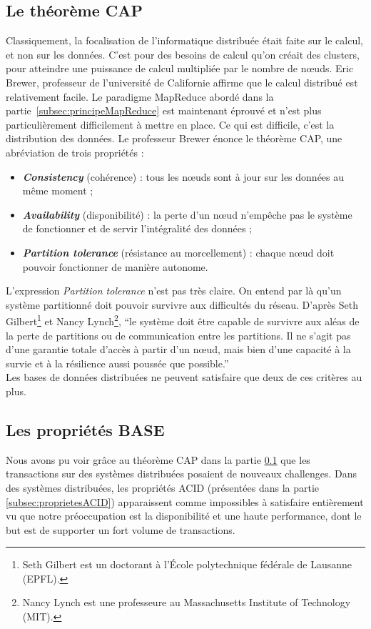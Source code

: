 \subsection{Le théorème CAP}
\label{subsec:theoremeCAP}
	Classiquement, la focalisation de l'informatique distribuée était faite sur le calcul, et non sur les données. C'est pour des besoins de calcul qu'on créait des clusters, pour atteindre une puissance de calcul multipliée par le nombre de nœuds. Eric Brewer, professeur de l'université de Californie affirme que le calcul distribué est relativement facile. Le paradigme MapReduce abordé dans la partie~\ref{subsec:principeMapReduce} est maintenant éprouvé et n'est plus particulièrement difficilement à mettre en place. Ce qui est difficile, c'est la distribution des données. Le professeur Brewer énonce le théorème CAP, une abréviation de trois propriétés :
	\vspace{10px}
	\begin{itemize}
		\item \textbf{\textit{Consistency}} (cohérence) : tous les nœuds sont à jour sur les données au même moment ; 
		\item \textbf{\textit{Availability}} (disponibilité) : la perte d'un nœud n'empêche pas le système de fonctionner et de servir l'intégralité des données ; 
		\item \textbf{\textit{Partition tolerance}} (résistance au morcellement) : chaque nœud doit pouvoir fonctionner de manière autonome. 
	\end{itemize}
	\vspace{20px}
	L'expression \textit{Partition tolerance} n'est pas très claire. On entend par là qu'un système partitionné doit pouvoir survivre aux difficultés du réseau. D'après Seth Gilbert\footnote{Seth Gilbert est un doctorant à l'École polytechnique fédérale de Lausanne (EPFL).} et Nancy Lynch\footnote{Nancy Lynch est une professeure au Massachusetts Institute of Technology (MIT).}, \enquote{le système doit être capable de survivre aux aléas de la perte de partitions ou de communication entre les partitions. Il ne s'agit pas d'une garantie totale d'accès à partir d'un nœud, mais bien d'une capacité à la survie et à la résilience aussi poussée que possible.}\\

	Les bases de données distribuées ne peuvent satisfaire que deux de ces critères au plus.

\subsection{Les propriétés BASE}
	Nous avons pu voir grâce au théorème CAP dans la partie \ref{subsec:theoremeCAP} que les transactions sur des systèmes distribuées posaient de nouveaux challenges. Dans des systèmes distribuées, les propriétés ACID (présentées dans la partie \ref{subsec:proprietesACID}) apparaissent comme impossibles à satisfaire entièrement vu que notre préoccupation est la disponibilité et une haute performance, dont le but est de supporter un fort volume de transactions.\\

